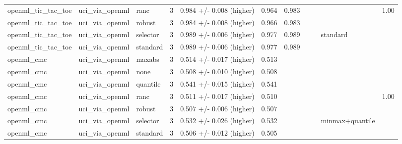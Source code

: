 \begin{tabular}{lllllllllll}
openml\_tic\_tac\_toe & uci\_via\_openml & ranc & 3 & 0.984 +/- 0.008 (higher) & 0.964 & 0.983 &  &  &  & 1.00 \\
openml\_tic\_tac\_toe & uci\_via\_openml & robust & 3 & 0.984 +/- 0.008 (higher) & 0.966 & 0.983 &  &  &  &  \\
openml\_tic\_tac\_toe & uci\_via\_openml & selector & 3 & 0.989 +/- 0.006 (higher) & 0.977 & 0.989 &  &  & standard &  \\
openml\_tic\_tac\_toe & uci\_via\_openml & standard & 3 & 0.989 +/- 0.006 (higher) & 0.977 & 0.989 &  &  &  &  \\
openml\_cmc & uci\_via\_openml & maxabs & 3 & 0.514 +/- 0.017 (higher) & 0.513 &  &  &  &  &  \\
openml\_cmc & uci\_via\_openml & none & 3 & 0.508 +/- 0.010 (higher) & 0.508 &  &  &  &  &  \\
openml\_cmc & uci\_via\_openml & quantile & 3 & 0.541 +/- 0.015 (higher) & 0.541 &  &  &  &  &  \\
openml\_cmc & uci\_via\_openml & ranc & 3 & 0.511 +/- 0.017 (higher) & 0.510 &  &  &  &  & 1.00 \\
openml\_cmc & uci\_via\_openml & robust & 3 & 0.507 +/- 0.006 (higher) & 0.507 &  &  &  &  &  \\
openml\_cmc & uci\_via\_openml & selector & 3 & 0.532 +/- 0.026 (higher) & 0.532 &  &  &  & minmax+quantile &  \\
openml\_cmc & uci\_via\_openml & standard & 3 & 0.506 +/- 0.012 (higher) & 0.505 &  &  &  &  &  \\
\bottomrule
\end{tabular}
